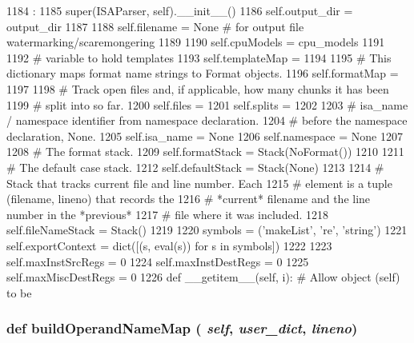 \begin{DoxyCode}
1184                                               :
1185         super(ISAParser, self).__init__()
1186         self.output_dir = output_dir
1187 
1188         self.filename = None # for output file watermarking/scaremongering
1189 
1190         self.cpuModels = cpu_models
1191 
1192         # variable to hold templates
1193         self.templateMap = {}
1194 
1195         # This dictionary maps format name strings to Format objects.
1196         self.formatMap = {}
1197 
1198         # Track open files and, if applicable, how many chunks it has been
1199         # split into so far.
1200         self.files = {}
1201         self.splits = {}
1202 
1203         # isa_name / namespace identifier from namespace declaration.
1204         # before the namespace declaration, None.
1205         self.isa_name = None
1206         self.namespace = None
1207 
1208         # The format stack.
1209         self.formatStack = Stack(NoFormat())
1210 
1211         # The default case stack.
1212         self.defaultStack = Stack(None)
1213 
1214         # Stack that tracks current file and line number.  Each
1215         # element is a tuple (filename, lineno) that records the
1216         # *current* filename and the line number in the *previous*
1217         # file where it was included.
1218         self.fileNameStack = Stack()
1219 
1220         symbols = ('makeList', 're', 'string')
1221         self.exportContext = dict([(s, eval(s)) for s in symbols])
1222 
1223         self.maxInstSrcRegs = 0
1224         self.maxInstDestRegs = 0
1225         self.maxMiscDestRegs = 0
1226 
    def __getitem__(self, i):    # Allow object (self) to be
\end{DoxyCode}
\hypertarget{classisa__parser_1_1ISAParser_a1fcd2036bbab05b2b16f72991d5749a7}{
\subsubsection[{buildOperandNameMap}]{\setlength{\rightskip}{0pt plus 5cm}def buildOperandNameMap ( {\em self}, \/   {\em user\_\-dict}, \/   {\em lineno})}}
\label{classisa__parser_1_1ISAParser_a1fcd2036bbab05b2b16f72991d5749a7}



